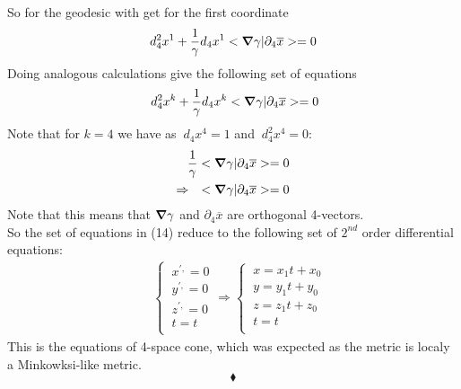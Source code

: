 So for the geodesic with get for the first coordinate $$d^2_4x^1+ \frac{1}{\gamma}d_4x^1 < \grad \gamma|\partial_4 \overline{x} > = 0 $$
Doing analogous calculations give the following set of equations
\begin{align}
\ d^2_4x^k+ \frac{1}{\gamma}d_4x^k < \grad \gamma|\partial_4 \overline{x} > = 0 
\end{align}
Note that for $k=4$ we have as $\ d_4x^4 = 1$ and $\ d^2_4x^4 = 0$:
\begin{align}
 \frac{1}{\gamma}< \grad \gamma|\partial_4 \overline{x} > = 0 \\
 \Rightarrow \quad < \grad \gamma|\partial_4 \overline{x} > = 0 
\end{align}
Note that this means that $\grad \gamma$ and $\partial_4 \overline{x}$ are orthogonal 4-vectors.\\
So the set of equations in (14) reduce to the following set of $2^{nd}$ order differential equations:
\begin{align}
\ & \left  \{ \begin{array}{l}
\ x^{',} = 0\\
\ y^{',} = 0\\
\ z^{',} = 0\\
\ t = t\\
\end{array} \right.
\Rightarrow  \left  \{ \begin{array}{l}
\ x = x_1t+x_0\\
\ y =y_1t+y_0\\
\ z = z_1t+z_0\\
\ t = t\\
\end{array} \right.
\end{align}
This is the equations of 4-space cone, which was expected as the metric is localy a Minkowksi-like metric. 
$$\blacklozenge$$
\newpage

